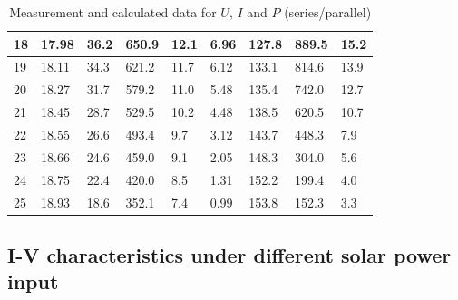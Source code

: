 \documentclass[12pt, a4paper]{article}
\begin{document}
\begin{table}[H]
\begin{center}
\begin{tabular}{|l|llll|llll|}
	18 & \multicolumn{1}{l|}{17.98}  & \multicolumn{1}{l|}{36.2}    & \multicolumn{1}{l|}{650.9}   & 12.1      & \multicolumn{1}{l|}{6.96}   & \multicolumn{1}{l|}{127.8}   & \multicolumn{1}{l|}{889.5}     & 15.2      \\ \hline
	19 & \multicolumn{1}{l|}{18.11}  & \multicolumn{1}{l|}{34.3}    & \multicolumn{1}{l|}{621.2}   & 11.7      & \multicolumn{1}{l|}{6.12}   & \multicolumn{1}{l|}{133.1}   & \multicolumn{1}{l|}{814.6}     & 13.9      \\ \hline
	20 & \multicolumn{1}{l|}{18.27}  & \multicolumn{1}{l|}{31.7}    & \multicolumn{1}{l|}{579.2}   & 11.0      & \multicolumn{1}{l|}{5.48}   & \multicolumn{1}{l|}{135.4}   & \multicolumn{1}{l|}{742.0}     & 12.7      \\ \hline
	21 & \multicolumn{1}{l|}{18.45}  & \multicolumn{1}{l|}{28.7}    & \multicolumn{1}{l|}{529.5}   & 10.2      & \multicolumn{1}{l|}{4.48}   & \multicolumn{1}{l|}{138.5}   & \multicolumn{1}{l|}{620.5}     & 10.7      \\ \hline
	22 & \multicolumn{1}{l|}{18.55}  & \multicolumn{1}{l|}{26.6}    & \multicolumn{1}{l|}{493.4}   & 9.7       & \multicolumn{1}{l|}{3.12}   & \multicolumn{1}{l|}{143.7}   & \multicolumn{1}{l|}{448.3}     & 7.9       \\ \hline
	23 & \multicolumn{1}{l|}{18.66}  & \multicolumn{1}{l|}{24.6}    & \multicolumn{1}{l|}{459.0}   & 9.1       & \multicolumn{1}{l|}{2.05}   & \multicolumn{1}{l|}{148.3}   & \multicolumn{1}{l|}{304.0}     & 5.6       \\ \hline
	24 & \multicolumn{1}{l|}{18.75}  & \multicolumn{1}{l|}{22.4}    & \multicolumn{1}{l|}{420.0}   & 8.5       & \multicolumn{1}{l|}{1.31}   & \multicolumn{1}{l|}{152.2}   & \multicolumn{1}{l|}{199.4}     & 4.0       \\ \hline
	25 & \multicolumn{1}{l|}{18.93}  & \multicolumn{1}{l|}{18.6}    & \multicolumn{1}{l|}{352.1}   & 7.4       & \multicolumn{1}{l|}{0.99}   & \multicolumn{1}{l|}{153.8}   & \multicolumn{1}{l|}{152.3}     & 3.3       \\ \hline
	\end{tabular}
	\caption{Measurement and calculated data for $U$, $I$ and $P$ (series/parallel)}
	\end{center}
\end{table}

\subsection{ I-V characteristics under different solar power input}
\end{document}
